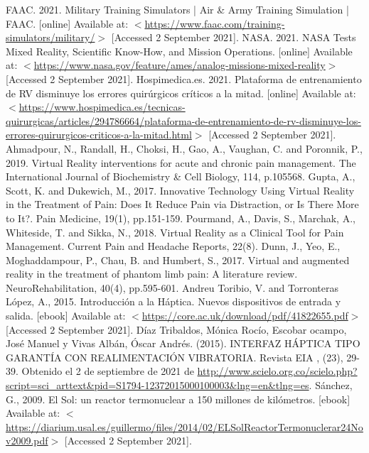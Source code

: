 \begin{thebibliography}{2}
	 FAAC. 2021. Military Training Simulators | Air \& Army Training Simulation | FAAC. [online] Available at: $<$\url{https://www.faac.com/training-simulators/military/}$>$ [Accessed 2 September 2021].
	 NASA. 2021. NASA Tests Mixed Reality, Scientific Know-How, and Mission Operations. [online] Available at: $<$\url{https://www.nasa.gov/feature/ames/analog-missions-mixed-reality}$>$ [Accessed 2 September 2021].
	 Hospimedica.es. 2021. Plataforma de entrenamiento de RV disminuye los errores quirúrgicos críticos a la mitad. [online] Available at: $<$\href{https://www.hospimedica.es/tecnicas-quirurgicas/articles/294786664/plataforma-de-entrenamiento-de-rv-disminuye-los-errores-quirurgicos-criticos-a-la-mitad.html}{https://www.hospimedica.es/tecnicas-quirurgicas/articles/294786664/plataforma-de-entrenamiento-de-rv-disminuye-los-errores-quirurgicos-criticos-a-la-mitad.html}$>$ [Accessed 2 September 2021].
	 Ahmadpour, N., Randall, H., Choksi, H., Gao, A., Vaughan, C. and Poronnik, P., 2019. Virtual Reality interventions for acute and chronic pain management. The International Journal of Biochemistry \& Cell Biology, 114, p.105568.
	 Gupta, A., Scott, K. and Dukewich, M., 2017. Innovative Technology Using Virtual Reality in the Treatment of Pain: Does It Reduce Pain via Distraction, or Is There More to It?. Pain Medicine, 19(1), pp.151-159.
	 Pourmand, A., Davis, S., Marchak, A., Whiteside, T. and Sikka, N., 2018. Virtual Reality as a Clinical Tool for Pain Management. Current Pain and Headache Reports, 22(8).
	 Dunn, J., Yeo, E., Moghaddampour, P., Chau, B. and Humbert, S., 2017. Virtual and augmented reality in the treatment of phantom limb pain: A literature review. NeuroRehabilitation, 40(4), pp.595-601.
	 Andreu Toribio, V. and Torronteras López, A., 2015. Introducción a la Háptica. Nuevos dispositivos de entrada y salida. [ebook] Available at: $<$\url{https://core.ac.uk/download/pdf/41822655.pdf}$>$ [Accessed 2 September 2021].
	 Díaz Tribaldos, Mónica Rocío, Escobar ocampo, José Manuel y Vivas Albán, Óscar Andrés. (2015). INTERFAZ HÁPTICA TIPO GARANTÍA CON REALIMENTACIÓN VIBRATORIA. Revista EIA , (23), 29-39. Obtenido el 2 de septiembre de 2021 de \url{http://www.scielo.org.co/scielo.php?script=sci\_arttext\&pid=S1794-12372015000100003\&lng=en\&tlng=es}.
	 Sánchez, G., 2009. El Sol: un reactor termonuclear a 150 millones de kilómetros. [ebook] Available at: $<$\url{https://diarium.usal.es/guillermo/files/2014/02/ELSolReactorTermonuclerar24Nov2009.pdf}$>$ [Accessed 2 September 2021].

\end{thebibliography}
